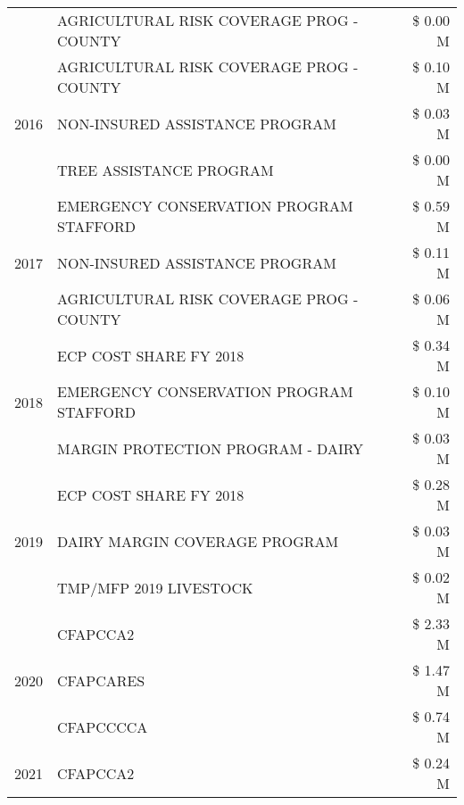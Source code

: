\begin{tabular}{llr}
 & AGRICULTURAL RISK COVERAGE PROG - COUNTY & \$ 0.00 M \\
\cline{1-3}
\multirow[t]{3}{*}{2016} & AGRICULTURAL RISK COVERAGE PROG - COUNTY      & \$ 0.10 M \\
 & NON-INSURED ASSISTANCE PROGRAM                & \$ 0.03 M \\
 & TREE ASSISTANCE PROGRAM                       & \$ 0.00 M \\
\cline{1-3}
\multirow[t]{3}{*}{2017} & EMERGENCY CONSERVATION PROGRAM STAFFORD & \$ 0.59 M \\
 & NON-INSURED ASSISTANCE PROGRAM & \$ 0.11 M \\
 & AGRICULTURAL RISK COVERAGE PROG - COUNTY & \$ 0.06 M \\
\cline{1-3}
\multirow[t]{3}{*}{2018} & ECP COST SHARE FY 2018 & \$ 0.34 M \\
 & EMERGENCY CONSERVATION PROGRAM STAFFORD & \$ 0.10 M \\
 & MARGIN PROTECTION PROGRAM - DAIRY & \$ 0.03 M \\
\cline{1-3}
\multirow[t]{3}{*}{2019} & ECP COST SHARE FY 2018 & \$ 0.28 M \\
 & DAIRY MARGIN COVERAGE PROGRAM & \$ 0.03 M \\
 & TMP/MFP 2019 LIVESTOCK & \$ 0.02 M \\
\cline{1-3}
\multirow[t]{3}{*}{2020} & CFAPCCA2 & \$ 2.33 M \\
 & CFAPCARES & \$ 1.47 M \\
 & CFAPCCCCA & \$ 0.74 M \\
\cline{1-3}
2021 & CFAPCCA2 & \$ 0.24 M \\
\cline{1-3}
\bottomrule
\end{tabular}
